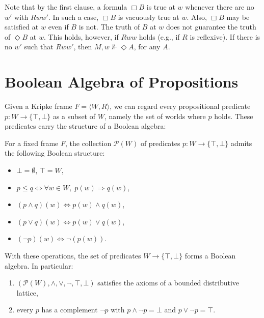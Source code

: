 Note that by the first clause, a formula $\Box B$ is true at $w$ whenever there 
are no $w'$ with $Rww'$. In such a case, $\Box B$ is vacuously true at $w$. 
Also, $\Box B$ may be satisfied at $w$ even if $B$ is not. The truth of $B$ 
at $w$ does not guarantee the truth of $\Diamond B$ at $w$. This holds, 
however, if $Rww$ holds (e.g., if $R$ is reflexive). If there is no $w'$ 
such that $Rww'$, then $M, w \not\Vdash \Diamond A$, for any $A$.


\section{Boolean Algebra of Propositions}

Given a Kripke frame $F = \langle W, R \rangle$, we can regard every
propositional predicate $p : W \to \{\top,\bot\}$ as a subset of $W$,
namely the set of worlds where $p$ holds. These predicates carry the
structure of a Boolean algebra:

\begin{definition}
  \label{def:boolean-structure}
    \leanok

  For a fixed frame $F$, the collection $\mathcal{P}(W)$ of
  predicates $p : W \to \{\top,\bot\}$ admits the following Boolean
  structure:
  \begin{itemize}
    \item $\bot = \emptyset$, $\top = W$,
    \item $p \leq q \iff \forall w \in W,\; p(w) \Rightarrow q(w)$,
    \item $(p \wedge q)(w) \iff p(w) \wedge q(w)$,
    \item $(p \vee q)(w) \iff p(w) \vee q(w)$,
    \item $(\neg p)(w) \iff \neg (p(w))$.
  \end{itemize}
\end{definition}

\begin{proposition}
  \label{prop:boolean-algebra}
    \leanok
  With these operations, the set of predicates $W \to \{\top,\bot\}$
  forms a Boolean algebra. In particular:
  \begin{enumerate}
    \item $(\mathcal{P}(W), \wedge, \vee, \neg, \top, \bot)$ satisfies
          the axioms of a bounded distributive lattice,
    \item every $p$ has a complement $\neg p$ with
          $p \wedge \neg p = \bot$ and $p \vee \neg p = \top$.
  \end{enumerate}
\end{proposition}

